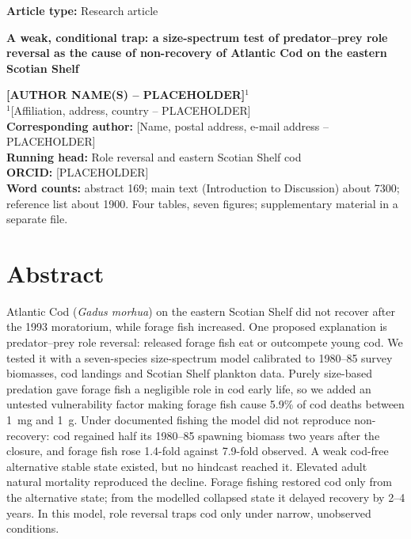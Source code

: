 \documentclass[12pt,letterpaper,fleqn]{article}
\begin{document}
\sloppy

\begin{titlepage}
\begin{flushleft}
\textbf{Article type:} Research article\\[1.5em]
{\Large\bfseries A weak, conditional trap: a size-spectrum test of predator--prey role reversal as the cause of non-recovery of Atlantic Cod on the eastern Scotian Shelf\par}
\vspace{2em}
\textbf{[AUTHOR NAME(S) -- PLACEHOLDER]}$^{1}$\\[0.8em]
$^{1}$[Affiliation, address, country -- PLACEHOLDER]\\[1.5em]
\textbf{Corresponding author:} [Name, postal address, e-mail address -- PLACEHOLDER]\\[1.5em]
\textbf{Running head:} Role reversal and eastern Scotian Shelf cod\\[1.5em]
\textbf{ORCID:} [PLACEHOLDER]\\[1.5em]
\textbf{Word counts:} abstract 169; main text (Introduction to Discussion) about 7300; reference list about 1900. Four tables, seven figures; supplementary material in a separate file.
\end{flushleft}
\end{titlepage}

\section*{Abstract}
Atlantic Cod (\textit{Gadus morhua}) on the eastern Scotian Shelf did not recover after the 1993 moratorium, while forage fish increased. One proposed explanation is predator--prey role reversal: released forage fish eat or outcompete young cod. We tested it with a seven-species size-spectrum model calibrated to 1980--85 survey biomasses, cod landings and Scotian Shelf plankton data. Purely size-based predation gave forage fish a negligible role in cod early life, so we added an untested vulnerability factor making forage fish cause 5.9\% of cod deaths between 1~mg and 1~g. Under documented fishing the model did not reproduce non-recovery: cod regained half its 1980--85 spawning biomass two years after the closure, and forage fish rose 1.4-fold against 7.9-fold observed. A weak cod-free alternative stable state existed, but no hindcast reached it. Elevated adult natural mortality reproduced the decline. Forage fishing restored cod only from the alternative state; from the modelled collapsed state it delayed recovery by 2--4 years. In this model, role reversal traps cod only under narrow, unobserved conditions.
\end{document}
